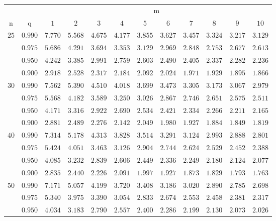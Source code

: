 \documentclass[11pt]{article}
\theoremstyle{definition}
\begin{document}
\begin{table}[H]
	\begin{tabularx}{\linewidth}{c | c | c c c c c c c c c c}
		& & \multicolumn{10}{c}{m}\\
		\cline{3-12}
		n & q & $1$ & $2$ & $3$ & $4$ & $5$ & $6$ & $7$ & $8$ & $9$ & $10$\\
		\hline
		$25$ & $0.990$ & $7.770$ & $5.568$ & $4.675$ & $4.177$ & $3.855$ & $3.627$ & $3.457$ & $3.324$ & $3.217$ & $3.129$ \\
		& $0.975$ & $5.686$ & $4.291$ & $3.694$ & $3.353$ & $3.129$ & $2.969$ & $2.848$ & $2.753$ & $2.677$ & $2.613$ \\
		& $0.950$ & $4.242$ & $3.385$ & $2.991$ & $2.759$ & $2.603$ & $2.490$ & $2.405$ & $2.337$ & $2.282$ & $2.236$ \\
		& $0.900$ & $2.918$ & $2.528$ & $2.317$ & $2.184$ & $2.092$ & $2.024$ & $1.971$ & $1.929$ & $1.895$ & $1.866$ \\
		$30$ & $0.990$ & $7.562$ & $5.390$ & $4.510$ & $4.018$ & $3.699$ & $3.473$ & $3.305$ & $3.173$ & $3.067$ & $2.979$ \\
		& $0.975$ & $5.568$ & $4.182$ & $3.589$ & $3.250$ & $3.026$ & $2.867$ & $2.746$ & $2.651$ & $2.575$ & $2.511$ \\
		& $0.950$ & $4.171$ & $3.316$ & $2.922$ & $2.690$ & $2.534$ & $2.421$ & $2.334$ & $2.266$ & $2.211$ & $2.165$ \\
		& $0.900$ & $2.881$ & $2.489$ & $2.276$ & $2.142$ & $2.049$ & $1.980$ & $1.927$ & $1.884$ & $1.849$ & $1.819$ \\
		$40$ & $0.990$ & $7.314$ & $5.178$ & $4.313$ & $3.828$ & $3.514$ & $3.291$ & $3.124$ & $2.993$ & $2.888$ & $2.801$ \\
		& $0.975$ & $5.424$ & $4.051$ & $3.463$ & $3.126$ & $2.904$ & $2.744$ & $2.624$ & $2.529$ & $2.452$ & $2.388$ \\
		& $0.950$ & $4.085$ & $3.232$ & $2.839$ & $2.606$ & $2.449$ & $2.336$ & $2.249$ & $2.180$ & $2.124$ & $2.077$ \\
		& $0.900$ & $2.835$ & $2.440$ & $2.226$ & $2.091$ & $1.997$ & $1.927$ & $1.873$ & $1.829$ & $1.793$ & $1.763$ \\
		$50$ & $0.990$ & $7.171$ & $5.057$ & $4.199$ & $3.720$ & $3.408$ & $3.186$ & $3.020$ & $2.890$ & $2.785$ & $2.698$ \\
		& $0.975$ & $5.340$ & $3.975$ & $3.390$ & $3.054$ & $2.833$ & $2.674$ & $2.553$ & $2.458$ & $2.381$ & $2.317$ \\
		& $0.950$ & $4.034$ & $3.183$ & $2.790$ & $2.557$ & $2.400$ & $2.286$ & $2.199$ & $2.130$ & $2.073$ & $2.026$ \\

\end{tabularx}
\end{table}
\end{document}
